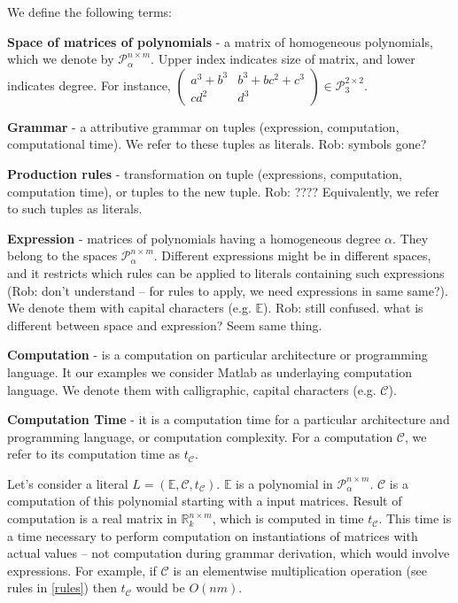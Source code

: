 We define the following terms: %


{\bf Space of matrices of polynomials} - a matrix of homogeneous polynomials, which we denote by $\mathcal{P}^{n \times m}_{\alpha}$. Upper index indicates size of matrix, and lower indicates degree. For instance, $\begin{pmatrix} a^3 + b^3 & b^3 + bc^2 + c^3\\ cd^2 & d^3 \end{pmatrix} \in \mathcal{P}^{2 \times 2}_3$. 

{\bf Grammar} - a attributive grammar on tuples (expression, computation, computational time). We refer to these tuples as literals. Rob: symbols gone?


{\bf Production rules} - transformation on tuple (expressions, computation, computation time), or tuples to the new tuple. Rob: ???? Equivalently, we refer to such tuples as literals. 


{\bf Expression} - matrices of polynomials having a homogeneous degree $\alpha$. They belong to the spaces $\mathcal{P}^{n \times m}_\alpha$. Different expressions might be in different spaces, and it restricts which rules can be applied to literals containing such expressions (Rob: don't understand -- for rules to apply, we need expressions in same same?). We denote them with capital characters (e.g. $\mathbb{E}$). Rob: still confused. what is different between space and expression? Seem same thing.


{\bf Computation} - is a computation on particular architecture or programming language. It our examples we consider Matlab as underlaying computation language. We denote them with calligraphic, capital characters (e.g. $\mathcal{C}$).


{\bf Computation Time} - it is a computation time for a particular architecture and programming language, or computation complexity. For a computation $\mathcal{C}$, we refer to its computation time as $t_{\mathcal{C}}$. 


Let's consider a literal $L = (\mathbb{E}, \mathcal{C}, t_\mathcal{C})$. $\mathbb{E}$ is a polynomial in $\mathcal{P}^{n \times m}_{\alpha}$. $\mathcal{C}$ is a computation of this polynomial starting with a input matrices. Result of computation is a real matrix
in $\mathbb{R}^{n \times m}_k$, which is computed in time $t_\mathcal{C}$. This time is a time necessary to perform computation on instantiations of matrices with actual values -- not computation during grammar derivation, which would involve expressions. For example, if $\mathcal{C}$ is an elementwise multiplication operation (see rules in \ref{rules}) then $t_\mathcal{C}$ would be $O(nm)$.

